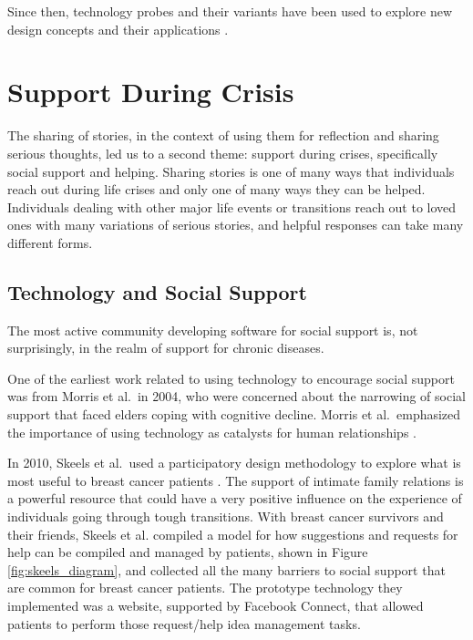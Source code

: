     Since then, technology probes and their variants have been used to explore
    new design concepts and their applications \cite{vetere05, lottridge09}.

\section{Support During Crisis}
  The sharing of stories,
  in the context of using them for reflection and sharing serious thoughts,
  led us to a second theme:
  support during crises,
  specifically social support and helping.
  Sharing stories is one of many ways that
  individuals reach out during life crises
  and only one of many ways they can be helped.
  Individuals dealing with other major life events or transitions
  reach out to loved ones with many variations of serious stories,
  and helpful responses can take many different forms.

  \subsection{Technology and Social Support}
    The most active community developing software for social support is,
    not surprisingly, in the realm of support for chronic diseases.

    One of the earliest work related to using technology to encourage social
    support was from Morris et al.\ in 2004,
    who were concerned about the narrowing of social support that faced
    elders coping with cognitive decline.
    Morris et al.\ emphasized the importance of using technology
    as catalysts for human relationships
    \cite{morris04}.

    In 2010, Skeels et al.\ used a participatory design methodology to explore what is most useful
    to breast cancer patients
    \cite{skeels10}.
    The support of intimate family relations is a powerful
    resource that could
    have a very positive influence on the experience of individuals going through
    tough transitions.
    With breast cancer survivors and their friends, Skeels et al. compiled a model for how
    suggestions and requests for help can be compiled and managed by patients,
    shown in Figure \ref{fig:skeels_diagram},
    and collected all the many barriers to social support that are common for breast cancer patients.
    The prototype technology they implemented was a website, supported by Facebook Connect,
    that allowed patients to perform those request/help idea management tasks.

